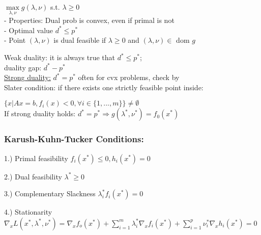 \documentclass[10pt,parskip]{scrartcl}
\begin{document}
\begin{multicols*}{3}
$\max \limits_{\lambda, \nu} g(\lambda, \nu)$ \hspace*{10mm} s.t. $\lambda \geq 0$\\
- Properties: Dual prob is convex, even if primal is not\\
- Optimal value $d^* \leq p^*$\\
- Point $(\lambda, \nu)$ is dual feasible if $\lambda \geq 0$ and $(\lambda, \nu) \in$ dom $g$



Weak duality: it is always true that $d^* \leq p^*$;\\ duality gap: $ d^* - p^*$\\
\underline{Strong duality:} $d^* = p^*$ often for cvx problems, check by\\
Slater condition: if there exists one strictly feasible point inside:

$\{x|Ax =b, f_i(x)<0, \forall i \in \{1,...,m\}\} \ne \emptyset$\\
If strong duality holds: $d^* = p^* \Rightarrow g(\lambda^*,\nu^*) = f_0(x^*)$


\subsubsection{Karush-Kuhn-Tucker Conditions:}

1.) Primal feasibility \hspace*{20mm}  $f_i(x^*) \leq 0, h_i(x^*) = 0$

2.) Dual feasibility \hspace*{22mm} $\lambda^* \geq 0$

3.) Complementary Slackness \hspace*{5mm} $\lambda_i^* f_i(x^*) = 0$ 

4.) Stationarity \hspace*{0mm}$\nabla_x L(x^*,\lambda^*, \nu^*) = \nabla_x f_o(x^*) + \sum_{i=1}^m \lambda_i^* \nabla_x f_i(x^*) + \sum_{i=1}^p  \nu_i^* \nabla_x h_i(x^*) = 0$



\end{multicols*}
\end{document}
